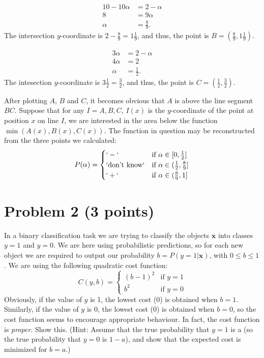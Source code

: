 \documentclass[10pt]{article}
\begin{document}
\begin{align*}
10 - 10\alpha &= 2 - \alpha \\
8 &= 9 \alpha \\
\alpha &= \frac{8}{9}.
\end{align*}
The intersection $y$-coordinate is $2 - \frac{8}{9} = 1\frac{1}{9}$, and thus, the point is $B = (\frac{8}{9}, 1\frac{1}{9})$.

\begin{align*}
3\alpha &= 2 - \alpha \\
4\alpha &= 2 \\
\alpha &= \frac{1}{2}.
\end{align*}
The intesection $y$-coordinate is $3 \frac{1}{2} = \frac{3}{2}$, and thus, the point is $C = (\frac{1}{2}, \frac{3}{2})$.

After plotting $A$, $B$ and $C$, it becomes obvious that $A$ is above the line segment $BC$. Suppose that for any $I = A, B, C$, $I(x)$ is the $y$-coordinate of the point at position $x$ on line $I$, we are interested in the area below the function $\min (A(x), B(x), C(x))$. The function in question may be reconstructed from the three points we calculated:
\[
P(\alpha) = 
\begin{cases}
`-` & \text{if } \alpha \in [0, \frac{1}{2}] \\
`\text{don't know}` & \text{if } \alpha \in (\frac{1}{2}, \frac{8}{9}] \\
`+` & \text{if } \alpha \in (\frac{8}{9}, 1] \\
\end{cases}
\]
\section*{Problem 2 (3 points)}
\color{blue}
In a binary classification task we are trying to classify the objects $\mathbf{x}$ into classes $y = 1$ and $y = 0$. We are here using probabilistic predictions, so for each new object we are required to output our probability $b = P(y = 1 | \mathbf{x})$, with $0 \leq b \leq 1$. We are using the following quadratic cost function:
\[
C(y, b) = 
\begin{cases}
(b - 1)^2 & \text{if } y = 1 \\
b^2       & \text{if } y = 0
\end{cases}
\]
Obviously, if the value of $y$ is 1, the lowest cost (0) is obtained when $b = 1$. Similarly, if the value of $y$ is 0, the lowest cost (0) is obtained when $b = 0$, so the cost function seems to encourage appropriate behaviour. In fact, the cost function is \textit{proper}. Show this. (Hint: Assume that the true probability that $y = 1$ is a (so the true probability that $y = 0$ is $1 - a$), and show that the expected cost is minimized for $b = a$.)
\color{black}
\end{document}

